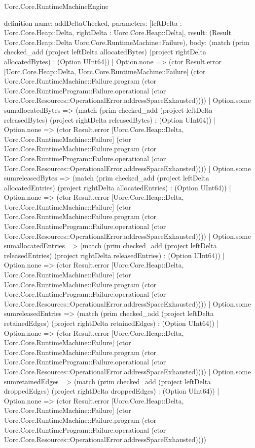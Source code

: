 \begin{lexlean}{Uorc.Core.RuntimeMachineEngine}
\begin{semanticmodule}
definition{
  name: addDeltaChecked,
  parameters: [leftDelta : Uorc.Core.Heap::Delta, rightDelta : Uorc.Core.Heap::Delta],
  result: (Result Uorc.Core.Heap::Delta Uorc.Core.RuntimeMachine::Failure),
  body: (match (prim checked_add (project leftDelta allocatedBytes) (project rightDelta allocatedBytes) : (Option UInt64))
    | Option.none => (ctor Result.error [Uorc.Core.Heap::Delta, Uorc.Core.RuntimeMachine::Failure] (ctor Uorc.Core.RuntimeMachine::Failure.program (ctor Uorc.Core.RuntimeProgram::Failure.operational (ctor Uorc.Core.Resources::OperationalError.addressSpaceExhausted))))
    | Option.some sumallocatedBytes => (match (prim checked_add (project leftDelta releasedBytes) (project rightDelta releasedBytes) : (Option UInt64))
      | Option.none => (ctor Result.error [Uorc.Core.Heap::Delta, Uorc.Core.RuntimeMachine::Failure] (ctor Uorc.Core.RuntimeMachine::Failure.program (ctor Uorc.Core.RuntimeProgram::Failure.operational (ctor Uorc.Core.Resources::OperationalError.addressSpaceExhausted))))
      | Option.some sumreleasedBytes => (match (prim checked_add (project leftDelta allocatedEntries) (project rightDelta allocatedEntries) : (Option UInt64))
        | Option.none => (ctor Result.error [Uorc.Core.Heap::Delta, Uorc.Core.RuntimeMachine::Failure] (ctor Uorc.Core.RuntimeMachine::Failure.program (ctor Uorc.Core.RuntimeProgram::Failure.operational (ctor Uorc.Core.Resources::OperationalError.addressSpaceExhausted))))
        | Option.some sumallocatedEntries => (match (prim checked_add (project leftDelta releasedEntries) (project rightDelta releasedEntries) : (Option UInt64))
          | Option.none => (ctor Result.error [Uorc.Core.Heap::Delta, Uorc.Core.RuntimeMachine::Failure] (ctor Uorc.Core.RuntimeMachine::Failure.program (ctor Uorc.Core.RuntimeProgram::Failure.operational (ctor Uorc.Core.Resources::OperationalError.addressSpaceExhausted))))
          | Option.some sumreleasedEntries => (match (prim checked_add (project leftDelta retainedEdges) (project rightDelta retainedEdges) : (Option UInt64))
            | Option.none => (ctor Result.error [Uorc.Core.Heap::Delta, Uorc.Core.RuntimeMachine::Failure] (ctor Uorc.Core.RuntimeMachine::Failure.program (ctor Uorc.Core.RuntimeProgram::Failure.operational (ctor Uorc.Core.Resources::OperationalError.addressSpaceExhausted))))
            | Option.some sumretainedEdges => (match (prim checked_add (project leftDelta droppedEdges) (project rightDelta droppedEdges) : (Option UInt64))
              | Option.none => (ctor Result.error [Uorc.Core.Heap::Delta, Uorc.Core.RuntimeMachine::Failure] (ctor Uorc.Core.RuntimeMachine::Failure.program (ctor Uorc.Core.RuntimeProgram::Failure.operational (ctor Uorc.Core.Resources::OperationalError.addressSpaceExhausted))))
}
\end{semanticmodule}
\end{lexlean}
